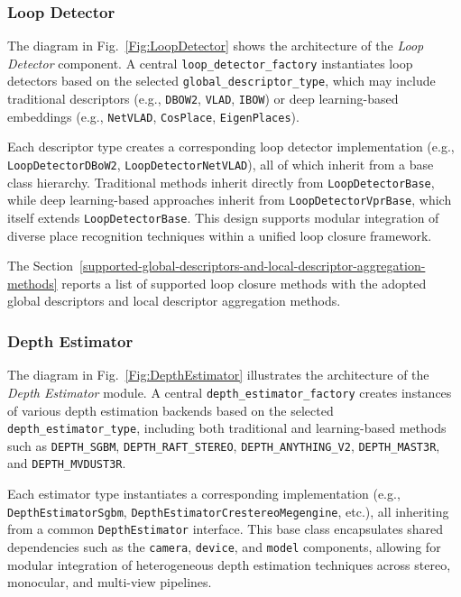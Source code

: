 \documentclass{article}
\begin{document}
\subsubsection{Loop Detector}

The diagram in Fig.~\ref{Fig:LoopDetector} shows the architecture of the \textit{Loop Detector} component. A central \texttt{loop\_detector\_factory} instantiates loop detectors based on the selected \texttt{global\_descriptor\_type}, which may include traditional descriptors (e.g., \texttt{DBOW2}\cite{galvez2012bags}, \texttt{VLAD}\cite{jegou2010aggregating}, \texttt{IBOW}\cite{garcia2018ibow}) or deep learning-based embeddings (e.g., \texttt{NetVLAD}\cite{arandjelovic2016netvlad}, \texttt{CosPlace}\cite{berton2023cosplace}, \texttt{EigenPlaces}\cite{berton2023eigenplaces}).

Each descriptor type creates a corresponding loop detector implementation (e.g., \texttt{LoopDetectorDBoW2}, \texttt{LoopDetectorNetVLAD}), all of which inherit from a base class hierarchy. Traditional methods inherit directly from \texttt{LoopDetectorBase}, while deep learning-based approaches inherit from \texttt{LoopDetectorVprBase}, which itself extends \texttt{LoopDetectorBase}. This design supports modular integration of diverse place recognition techniques within a unified loop closure framework.

The Section~\ref{supported-global-descriptors-and-local-descriptor-aggregation-methods} reports a list of supported loop closure methods with the adopted global descriptors and local descriptor aggregation methods.


\subsubsection{Depth Estimator}

The diagram in Fig.~\ref{Fig:DepthEstimator} illustrates the architecture of the \textit{Depth Estimator} module. A central \texttt{depth\_estimator\_factory} creates instances of various depth estimation backends based on the selected \texttt{depth\_estimator\_type}, including both traditional and learning-based methods such as \texttt{DEPTH\_SGBM}\cite{hirschmuller2007stereo}, \texttt{DEPTH\_RAFT\_STEREO}\cite{teed2021raft}, \texttt{DEPTH\_ANYTHING\_V2}\cite{depthanythingv2_2024}, \texttt{DEPTH\_MAST3R}\cite{master}, and \texttt{DEPTH\_MVDUST3R}\cite{mvduster}.

Each estimator type instantiates a corresponding implementation (e.g., \texttt{DepthEstimatorSgbm}, \texttt{DepthEstimator\-Crestereo\-Megengine}, etc.), all inheriting from a common \texttt{DepthEstimator} interface. This base class encapsulates shared dependencies such as the \texttt{camera}, \texttt{device}, and \texttt{model} components, allowing for modular integration of heterogeneous depth estimation techniques across stereo, monocular, and multi-view pipelines.
\end{document}
